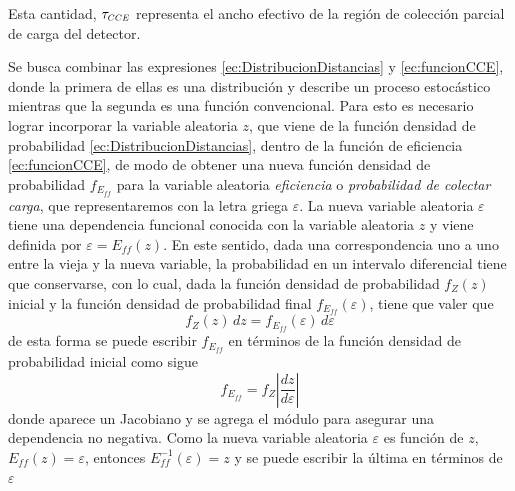 Esta cantidad, $\tau_{\scaleto{CCE}{4pt}}$ representa el ancho efectivo de la región de colección parcial de carga del detector.%

Se busca combinar las expresiones \eqref{ec:DistribucionDistancias} y \eqref{ec:funcionCCE}, donde la primera de ellas es una distribución y describe un proceso estocástico mientras que la segunda es una función convencional. Para esto es necesario lograr incorporar la variable aleatoria $z$, que viene de la función densidad de probabilidad \ref{ec:DistribucionDistancias}, dentro de la función de eficiencia \ref{ec:funcionCCE}, de modo de obtener una nueva función densidad de probabilidad $f_{E_{ff}}$ para la variable aleatoria \textit{eficiencia} o \textit{probabilidad de colectar carga}, que representaremos con la letra griega $\varepsilon$. La nueva variable aleatoria $\varepsilon$ tiene una dependencia funcional conocida con la variable aleatoria $z$ y viene definida por $\varepsilon = E_{ff}(z)$. En este sentido, dada una correspondencia uno a uno entre la vieja y la nueva variable, la probabilidad en un intervalo diferencial tiene que conservarse, con lo cual, dada la función densidad de probabilidad $f_{Z}(z)$ inicial y la función densidad de probabilidad final $f_{E_{ff}}(\varepsilon)$, tiene que valer que
\begin{equation*}
    f_{Z}(z)\,dz = f_{E_{ff}}(\varepsilon)\,d\varepsilon
\end{equation*}
de esta forma se puede escribir $f_{E_{ff}}$ en términos de la función densidad de probabilidad inicial como sigue
\begin{equation*}
    f_{E_{ff}} 
    = f_{Z}
    \left|
        \frac{dz}{d\varepsilon}
    \right|
\end{equation*}
donde aparece un Jacobiano y se agrega el módulo para asegurar una dependencia no negativa. Como la nueva variable aleatoria $\varepsilon$ es función de $z$, $E_{ff}(z) = \varepsilon$, entonces $E_{ff}^{-1}(\varepsilon) = z$ y se puede escribir la última en términos de $\varepsilon$
